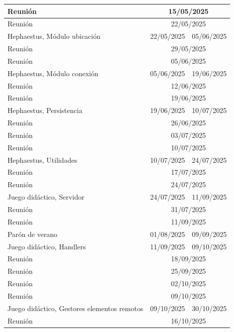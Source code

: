 {\begin{longtable}[c]{|l|cc|}
	Reunión & \multicolumn{2}{c|}{15/05/2025} \\ \hline
	Reunión & \multicolumn{2}{c|}{22/05/2025} \\ \hline
	Hephaestus, Módulo ubicación & \multicolumn{1}{c|}{22/05/2025} & 05/06/2025 \\ \hline
	Reunión & \multicolumn{2}{c|}{29/05/2025} \\ \hline
	Reunión & \multicolumn{2}{c|}{05/06/2025} \\ \hline
	Hephaestus, Módulo conexión & \multicolumn{1}{c|}{05/06/2025} & 19/06/2025 \\ \hline
	Reunión & \multicolumn{2}{c|}{12/06/2025} \\ \hline
	Reunión & \multicolumn{2}{c|}{19/06/2025} \\ \hline
	Hephaestus, Persistencia & \multicolumn{1}{c|}{19/06/2025} & 10/07/2025 \\ \hline
	Reunión & \multicolumn{2}{c|}{26/06/2025} \\ \hline
	Reunión & \multicolumn{2}{c|}{03/07/2025} \\ \hline
	Reunión & \multicolumn{2}{c|}{10/07/2025} \\ \hline
	Hephaestus, Utilidades & \multicolumn{1}{c|}{10/07/2025} & 24/07/2025 \\ \hline
	Reunión & \multicolumn{2}{c|}{17/07/2025} \\ \hline
	Reunión & \multicolumn{2}{c|}{24/07/2025} \\ \hline
	Juego didáctico, Servidor & \multicolumn{1}{c|}{24/07/2025} & 11/09/2025 \\ \hline
	Reunión & \multicolumn{2}{c|}{31/07/2025} \\ \hline
	Reunión & \multicolumn{2}{c|}{11/09/2025} \\ \hline
	Parón de verano & \multicolumn{1}{c|}{01/08/2025} & 09/09/2025 \\ \hline
	Juego didáctico, Handlers & \multicolumn{1}{c|}{11/09/2025} & 09/10/2025 \\ \hline
	Reunión & \multicolumn{2}{c|}{18/09/2025} \\ \hline
	Reunión & \multicolumn{2}{c|}{25/09/2025} \\ \hline
	Reunión & \multicolumn{2}{c|}{02/10/2025} \\ \hline
	Reunión & \multicolumn{2}{c|}{09/10/2025} \\ \hline
	Juego didáctico, Gestores elementos remotos & \multicolumn{1}{c|}{09/10/2025} & 30/10/2025 \\ \hline
	Reunión & \multicolumn{2}{c|}{16/10/2025} \\ \hline

\end{longtable}}
